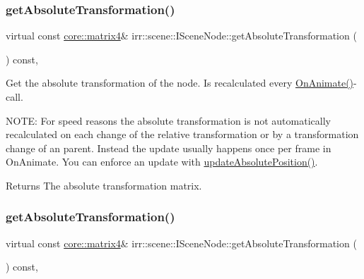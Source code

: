 \subsubsection{\texorpdfstring{get\+Absolute\+Transformation()}{getAbsoluteTransformation()}\hspace{0.1cm}{\footnotesize\ttfamily [1/2]}}
{\footnotesize\ttfamily virtual const \hyperlink{namespaceirr_1_1core_a4c9d4e29899535971052810954a14431}{core\+::matrix4}\& irr\+::scene\+::\+I\+Scene\+Node\+::get\+Absolute\+Transformation (\begin{DoxyParamCaption}{ }\end{DoxyParamCaption}) const\hspace{0.3cm}{\ttfamily [inline]}, {\ttfamily [virtual]}}



Get the absolute transformation of the node. Is recalculated every \hyperlink{classirr_1_1scene_1_1ISceneNode_afc1dcb5cb19116d0c7aa3d4ebdf04cc5}{On\+Animate()}-\/call. 

N\+O\+TE\+: For speed reasons the absolute transformation is not automatically recalculated on each change of the relative transformation or by a transformation change of an parent. Instead the update usually happens once per frame in On\+Animate. You can enforce an update with \hyperlink{classirr_1_1scene_1_1ISceneNode_aeb6e0dc034bb2101600ce87acbcf0f6e}{update\+Absolute\+Position()}. \begin{DoxyReturn}{Returns}
The absolute transformation matrix. 
\end{DoxyReturn}
\mbox{\label{classirr_1_1scene_1_1ISceneNode_af13dc546a7be796cc0868a2eec51e508}} 
\subsubsection{\texorpdfstring{get\+Absolute\+Transformation()}{getAbsoluteTransformation()}\hspace{0.1cm}{\footnotesize\ttfamily [2/2]}}
{\footnotesize\ttfamily virtual const \hyperlink{namespaceirr_1_1core_a4c9d4e29899535971052810954a14431}{core\+::matrix4}\& irr\+::scene\+::\+I\+Scene\+Node\+::get\+Absolute\+Transformation (\begin{DoxyParamCaption}{ }\end{DoxyParamCaption}) const\hspace{0.3cm}{\ttfamily [inline]}, {\ttfamily [virtual]}}




